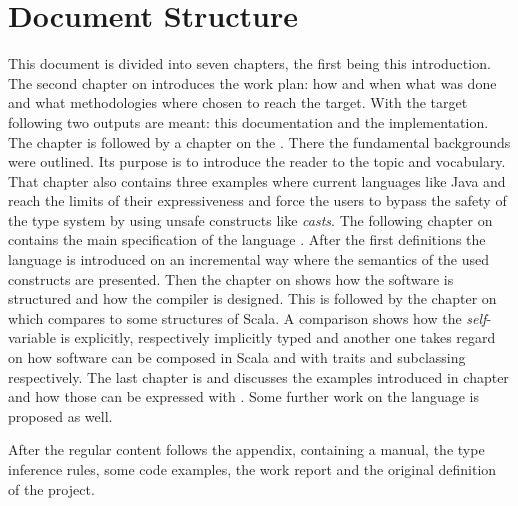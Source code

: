 \section{Document Structure}
This document is divided into seven chapters, the first being this
introduction. The second chapter on \emph{}
introduces the work plan: how and when what was done and what
methodologies where chosen to reach the target. With the target
following two outputs are meant: this documentation and the
implementation. The chapter is followed by a chapter on the
\emph{}. There the fundamental
backgrounds were outlined. Its purpose is to introduce the reader to
the topic and vocabulary. That chapter also contains three examples
where current languages like Java and \cs reach the limits of their
expressiveness and force the users to bypass the safety of the type
system by using unsafe constructs like \emph{casts}. The following
chapter on \emph{} contains
the main specification of the language \ooplss. After the first
definitions the language is introduced on an incremental way where
the semantics of the used constructs are presented. Then the chapter
on \emph{} shows how the software
is structured and how the compiler is designed. This is followed by
the chapter on \emph{} which compares
\ooplss to some structures of Scala. A comparison shows how the
\emph{self}-variable is explicitly, respectively implicitly typed and
another one takes regard on how software can be composed in Scala and
\ooplss with traits and subclassing respectively.  The last chapter is
\emph{} and discusses the examples
introduced in chapter \emph{} and how
those can be expressed with \ooplss. Some further work on the language
is proposed as well.

After the regular content follows the appendix, containing a manual, the type
inference rules, some code examples, the work report and the original
definition of the project.

